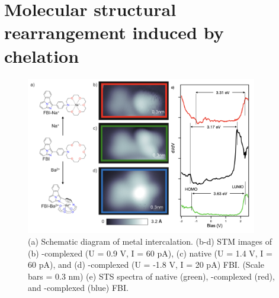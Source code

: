 \documentclass[aps,prl,reprint,longbibliography,superscriptaddress, english]{revtex4-1}
\begin{document}
\section{Molecular structural rearrangement induced by chelation}

\begin{figure}[ht!]
	\includegraphics[width=0.9\textwidth]{figures/Figure_4.png}
	\caption{\label{Fig_STS} 
    (a) Schematic diagram of metal intercalation. (b-d) STM images of (b) \Nap-complexed (U = 0.9 V, I = 60 pA), (c) native (U = 1.4 V, I = 60 pA), and (d) \Bapp-complexed (U = -1.8 V, I = 20 pA) FBI. (Scale bars = 0.3 nm) (e) STS spectra of native (green), \Nap-complexed (red), and \Bapp-complexed (blue) FBI.}
\end{figure}
\end{document}
